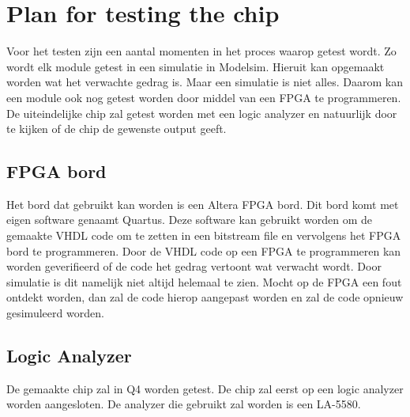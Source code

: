 \chapter{Plan for testing the chip}
Voor het testen zijn een aantal momenten in het proces waarop getest wordt. Zo wordt elk module getest in een simulatie in Modelsim. Hieruit kan opgemaakt worden wat het verwachte gedrag is. Maar een simulatie is niet alles. Daarom kan een module ook nog getest worden door middel van een FPGA te programmeren. De uiteindelijke chip zal getest worden met een logic analyzer en natuurlijk door te kijken of de chip de gewenste output geeft.
\section{FPGA bord}
Het bord dat gebruikt kan worden is een Altera FPGA bord. Dit bord komt met eigen software genaamt Quartus. Deze software kan gebruikt worden om de gemaakte VHDL code om te zetten in een bitstream file en vervolgens het FPGA bord te programmeren. Door de VHDL code op een FPGA te programmeren kan worden geverifieerd of de code het gedrag vertoont wat verwacht wordt. Door simulatie is dit namelijk niet altijd helemaal te zien. Mocht op de FPGA een fout ontdekt worden, dan zal de code hierop aangepast worden en zal de code opnieuw gesimuleerd worden.
\section{Logic Analyzer}
De gemaakte chip zal in Q4 worden getest. De chip zal eerst op een logic analyzer worden aangesloten. De analyzer die gebruikt zal worden is een LA-5580.

